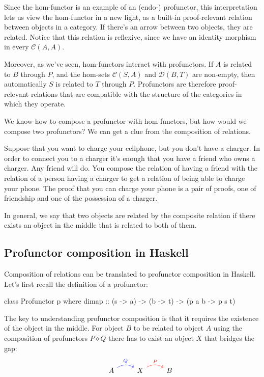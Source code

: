 \documentclass[DaoFP]{subfiles}
\begin{document}
Since the hom-functor is an example of an (endo-) profunctor, this interpretation lets us view the hom-functor in a new light, as a built-in proof-relevant relation between objects in a category. If there's an arrow between two objects, they are related. Notice that this relation is reflexive, since we have an identity morphism in every $\mathcal{C}(A, A)$. 

Moreover, as we've seen, hom-functors interact with profunctors. If $A$ is related to $B$ through $P$, and the hom-sets $\mathcal{C}(S, A)$ and $\mathcal{D}(B, T)$ are non-empty, then automatically $S$ is related to $T$ through $P$. Profunctors are therefore proof-relevant relations that are compatible with the structure of the categories in which they operate.

We know how to compose a profunctor with hom-functors, but how would we compose two profunctors? We can get a clue from the composition of relations. 

Suppose that you want to charge your cellphone, but you don't have a charger. In order to connect you to a charger it's enough that you have a friend who owns a charger. Any friend will do. You compose the relation of having a friend with the relation of a person having a charger to get a relation of being able to charge your phone. The proof that you can charge your phone is a pair of proofs, one of friendship and one of the possession of a charger. 

In general, we say that two objects are related by the composite relation if there exists an object in the middle that is related to both of them. 

\subsection{Profunctor composition in Haskell}

Composition of relations can be translated to profunctor composition in Haskell. Let's first recall the definition of a profunctor:
\begin{haskell}
class Profunctor p where
  dimap :: (s -> a) -> (b -> t) -> (p a b -> p s t)
\end{haskell}

The key to understanding profunctor composition is that it requires the existence of the object in the middle. For object $B$ to be related to object $A$ using the composition of profunctors $P \diamond Q$ there has to exist an object $X$ that bridges the gap:
\[
 \begin{tikzcd}
  & A
  \arrow[r, bend left, blue, "Q"]
 & X
  \arrow[r, bend left, red, "P"]
 & B
  \end{tikzcd}
\]
\end{document}
